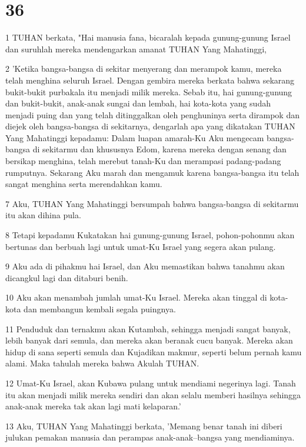 \chapter{36}

\par 1 TUHAN berkata, "Hai manusia fana, bicaralah kepada gunung-gunung Israel dan suruhlah mereka mendengarkan amanat TUHAN Yang Mahatinggi,
\par 2 'Ketika bangsa-bangsa di sekitar menyerang dan merampok kamu, mereka telah menghina seluruh Israel. Dengan gembira mereka berkata bahwa sekarang bukit-bukit purbakala itu menjadi milik mereka. Sebab itu, hai gunung-gunung dan bukit-bukit, anak-anak sungai dan lembah, hai kota-kota yang sudah menjadi puing dan yang telah ditinggalkan oleh penghuninya serta dirampok dan diejek oleh bangsa-bangsa di sekitarnya, dengarlah apa yang dikatakan TUHAN Yang Mahatinggi kepadamu: Dalam luapan amarah-Ku Aku mengecam bangsa-bangsa di sekitarmu dan khususnya Edom, karena mereka dengan senang dan bersikap menghina, telah merebut tanah-Ku dan merampasi padang-padang rumputnya. Sekarang Aku marah dan mengamuk karena bangsa-bangsa itu telah sangat menghina serta merendahkan kamu.
\par 7 Aku, TUHAN Yang Mahatinggi bersumpah bahwa bangsa-bangsa di sekitarmu itu akan dihina pula.
\par 8 Tetapi kepadamu Kukatakan hai gunung-gunung Israel, pohon-pohonmu akan bertunas dan berbuah lagi untuk umat-Ku Israel yang segera akan pulang.
\par 9 Aku ada di pihakmu hai Israel, dan Aku memastikan bahwa tanahmu akan dicangkul lagi dan ditaburi benih.
\par 10 Aku akan menambah jumlah umat-Ku Israel. Mereka akan tinggal di kota-kota dan membangun kembali segala puingnya.
\par 11 Penduduk dan ternakmu akan Kutambah, sehingga menjadi sangat banyak, lebih banyak dari semula, dan mereka akan beranak cucu banyak. Mereka akan hidup di sana seperti semula dan Kujadikan makmur, seperti belum pernah kamu alami. Maka tahulah mereka bahwa Akulah TUHAN.
\par 12 Umat-Ku Israel, akan Kubawa pulang untuk mendiami negerinya lagi. Tanah itu akan menjadi milik mereka sendiri dan akan selalu memberi hasilnya sehingga anak-anak mereka tak akan lagi mati kelaparan.'
\par 13 Aku, TUHAN Yang Mahatinggi berkata, 'Memang benar tanah ini diberi julukan pemakan manusia dan perampas anak-anak--bangsa yang mendiaminya.
